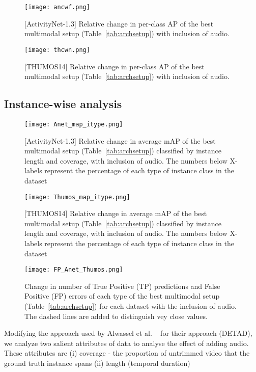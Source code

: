 \documentclass[10pt,twocolumn,letterpaper]{article}
\begin{document}
\begin{figure*}[!t]
\centering
\texttt{[image: ancwf.png]}
\caption{[ActivityNet-1.3] Relative change in per-class AP of the best multimodal setup (Table~\ref{tab:archsetup}) with inclusion of audio.} 
\label{fig:avnetcw}
\end{figure*}

\begin{figure*}[!t]
\centering
\texttt{[image: thcwn.png]}
\caption{[THUMOS14] Relative change in per-class AP of the best multimodal setup (Table~\ref{tab:archsetup}) with inclusion of audio.} 
\label{fig:thumoscw}
\end{figure*}

\subsection{Instance-wise analysis} 

\begin{figure*}[!t]
\centering
\texttt{[image: Anet\_map\_itype.png]}
\caption{[ActivityNet-1.3] Relative change in average mAP of the best multimodal setup (Table~\ref{tab:archsetup}) classified by instance length and coverage, with inclusion of audio. The numbers below X-labels represent the percentage of each type of instance class in the dataset} 
\label{fig:avnetit}
\end{figure*}

\begin{figure*}[!t]
\centering
\texttt{[image: Thumos\_map\_itype.png]}
\caption{[THUMOS14] Relative change in average mAP of the best multimodal setup (Table~\ref{tab:archsetup}) classified by instance length and coverage, with inclusion of audio. The numbers below X-labels represent the percentage of each type of instance class in the dataset} 
\label{fig:thumosit}
\end{figure*}

\begin{figure*}[!t]
\centering
\texttt{[image: FP\_Anet\_Thumos.png]}
\caption{Change in number of True Positive (TP) predictions and False Positive (FP) errors of each type of the best multimodal setup (Table~\ref{tab:archsetup}) for each dataset with the inclusion of audio. The dashed lines are added to distinguish vey close values.} 
\label{fig:fpat}
\end{figure*}

Modifying the approach used by Alwassel et al. ~\cite{alwassel_2018_detad} for their approach (DETAD), we analyze two salient attributes of data to analyse the effect of adding audio. These attributes are (i) coverage - the proportion of untrimmed video that the ground truth instance spans (ii) length (temporal duration)
\end{document}

